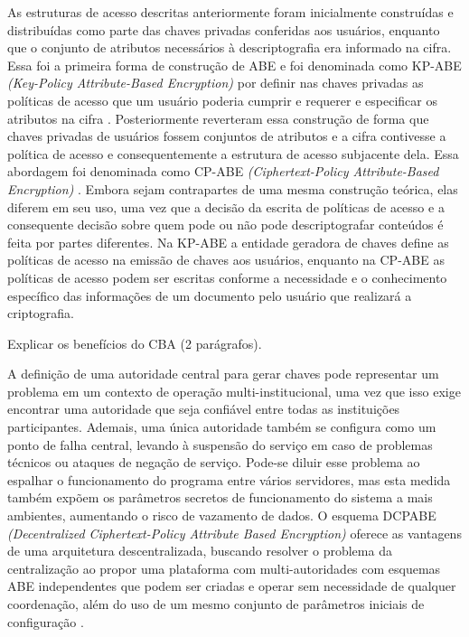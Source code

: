 \documentclass[a4paper,11pt]{article}
\begin{document}

As estruturas de acesso descritas anteriormente foram inicialmente construídas e distribuídas como parte das chaves privadas conferidas aos usuários, enquanto que o conjunto de atributos necessários à descriptografia era informado na cifra.
Essa foi a primeira forma de construção de ABE e foi denominada como KP-ABE \emph{(Key-Policy Attribute-Based Encryption)} por definir nas chaves privadas as políticas de acesso que um usuário poderia cumprir e requerer e especificar os atributos na cifra \cite{Goyal2006}.
Posteriormente reverteram essa construção de forma que chaves privadas de usuários fossem conjuntos de atributos e a cifra contivesse a política de acesso e consequentemente a estrutura de acesso subjacente dela. Essa abordagem foi denominada como CP-ABE \emph{(Ciphertext-Policy Attribute-Based Encryption)} \cite{Bethencourt2007}.
Embora sejam contrapartes de uma mesma construção teórica, elas diferem em seu uso, uma vez que a decisão da escrita de políticas de acesso e a consequente decisão sobre quem pode ou não pode descriptografar conteúdos é feita por partes diferentes.
Na KP-ABE a entidade geradora de chaves define as políticas de acesso na emissão de chaves aos usuários, enquanto na CP-ABE as políticas de acesso podem ser escritas conforme a necessidade e o conhecimento específico das informações de um documento pelo usuário que realizará a criptografia.


{\color{ForestGreen}Explicar os benefícios do CBA (2 parágrafos).}

A definição de uma autoridade central para gerar chaves pode representar um problema em um contexto de operação multi-institucional, uma vez que isso exige encontrar uma autoridade que seja confiável entre todas as instituições participantes.
Ademais, uma única autoridade também se configura como um ponto de falha central, levando à suspensão do serviço em caso de problemas técnicos ou ataques de negação de serviço.
Pode-se diluir esse problema ao espalhar o funcionamento do programa entre vários servidores, mas esta medida também expõem os parâmetros secretos de funcionamento do sistema a mais ambientes, aumentando o risco de vazamento de dados.
O esquema DCPABE \emph{(Decentralized Ciphertext-Policy Attribute Based Encryption)} oferece as vantagens de uma arquitetura descentralizada, buscando resolver o problema da centralização ao propor uma plataforma com multi-autoridades com esquemas ABE independentes que podem ser criadas e operar sem necessidade de qualquer coordenação, além do uso de um mesmo conjunto de parâmetros iniciais de configuração \cite{Lewko2011}.
\end{document}
